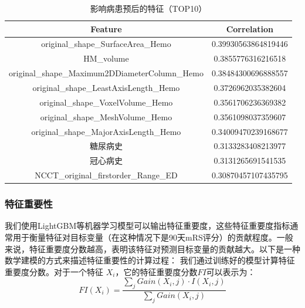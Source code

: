 \documentclass[bwprint]{gmcmthesis}
\begin{document}
\begin{table}[ht]
    \centering
    \caption{影响病患预后的特征（TOP10）}
    \label{tab:影响病患预后的前10个特征}
    \fontsize{11}{9}\selectfont
    \renewcommand\tabcolsep{6pt}
    {
    \begin{tabular}{cc}
    \toprule[1.2pt]
    Feature      &    Correlation         \\
    \midrule
    original\_shape\_SurfaceArea\_Hemo &  
     0.39930563864819446 \\
    HM\_volume  &  0.3855776316216518  \\
    original\_shape\_Maximum2DDiameterColumn\_Hemo &   0.38484300696888557 \\
    original\_shape\_LeastAxisLength\_Hemo         &   0.3726962035382604  \\
    original\_shape\_VoxelVolume\_Hemo             &   0.3561706236369382  \\
    original\_shape\_MeshVolume\_Hemo              &   0.3561098037359607  \\
    original\_shape\_MajorAxisLength\_Hemo         &   0.34009470239168677 \\
    糖尿病史       &   0.3133283408213977  \\
    冠心病史       &   0.3131265691541535  \\
    NCCT\_original\_firstorder\_Range\_ED        &   0.30870457107435795 \\
    \bottomrule[1.2pt]
    \end{tabular}
    }
\end{table}


\subsubsection{特征重要性}
我们使用LightGBM等机器学习模型可以输出特征重要度\cite{徐少成2018基于随机森林的加权特征选择算法}，这些特征重要度指标通常用于衡量特征对目标变量（在这种情况下是90天mRS评分）的贡献程度。一般来说，特征重要度分数越高，表明该特征对预测目标变量的贡献越大。以下是一种数学建模的方式来描述特征重要性的计算过程：
我们通过训练好的模型计算特征重要度分数。对于一个特征 $X_i$，它的特征重要度分数$FI$可以表示为：
\begin{equation}
FI(X_i)=\frac{\sum_{j}Gain(X_i,j)\cdot I(X_i, j)} {\sum_{j}Gain(X_i,j)}
\end{equation}
\end{document}
